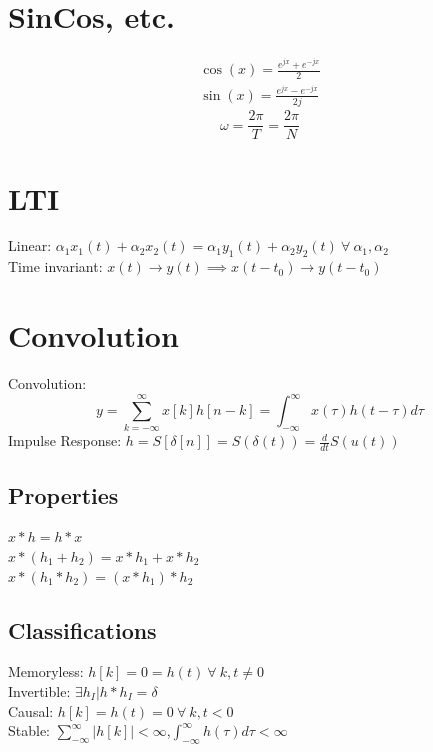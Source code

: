 \documentclass[twocolumn]{article}
\begin{document}
\section*{SinCos, etc.}
\begin{align*}
    \cos(x)=\frac{e^{jx}+e^{-jx}}{2} \\
    \sin(x)=\frac{e^{jx}-e^{-jx}}{2j}
\end{align*}
\begin{equation*}
    \omega = \frac{2\pi}{T}= \frac{2\pi}{N}
\end{equation*}
\section*{LTI}
Linear: $\alpha_1 x_1(t)+\alpha_2 x_2(t) = \alpha_1 y_1(t)+\alpha_2 y_2(t) ~\forall~ \alpha_1,\alpha_2$\\
Time invariant: $x(t) \rightarrow y(t) \implies x(t-t_0) \rightarrow y(t-t_0)$
\section*{Convolution}
Convolution:
\begin{equation*}
    y=\sum_{k=-\infty}^{\infty}x[k]h[n-k]=\int_{-\infty}^{\infty}x(\tau)h(t-\tau)d\tau
\end{equation*}
Impulse Response: $h=S[\delta[n]]=S(\delta(t)) = \frac{d}{dt}S(u(t))$
\subsection*{Properties}
$x*h=h*x$\\
$x*(h_1+h_2)=x*h_1+x*h_2$\\
$x*(h_1*h_2)=(x*h_1)*h_2$
\subsection*{Classifications}
Memoryless: $h[k]=0=h(t)~\forall~k,t\neq 0$\\ Invertible: $\exists h_I |
    h*h_I=\delta$\\ Causal: $h[k]=h(t)=0 ~\forall~ k,t<0$\\ Stable:
$\sum_{-\infty}^{\infty}|h[k]|<\infty$,$\int_{-\infty}^{\infty}h(\tau)d\tau<\infty$
\end{document}
